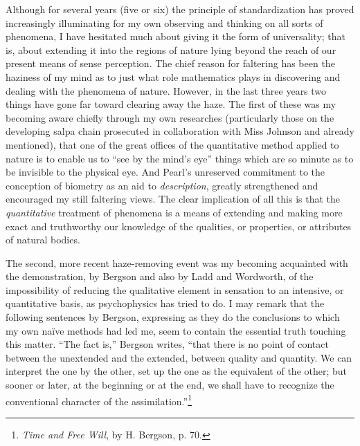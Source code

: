 \documentclass[a4paper, 11pt, oneside, polutonikogreek, english, landscape]{article}
\begin{document}
Although for several years (five or six) the principle of standardization has proved increasingly illuminating for my own observing and thinking on all sorts of phenomena, I have hesitated much about giving it the form of universality; that is, about extending it into the regions of nature lying beyond the reach of our present means of sense perception. The chief reason for faltering has been the haziness of my mind as to just what role mathematics plays in discovering and dealing with the phenomena of nature. However, in the last three years two things have gone far toward clearing away the haze. The first of these was my becoming aware chiefly through my own researches (particularly those on the developing salpa chain prosecuted in collaboration with Miss Johnson and already mentioned), that one of the great offices of the quantitative method applied to nature is to enable us to ``see by the mind's eye'' things which are so minute as to be invisible to the physical eye. And Pearl's unreserved commitment to the conception of biometry as an aid to \emph{description}, greatly strengthened and encouraged my still faltering views. The clear implication of all this is that the \emph{quantitative} treatment of phenomena is a means of extending and making more exact and truthworthy our knowledge of the qualities, or properties, or attributes of natural bodies.

The second, more recent haze-removing event was my becoming acquainted with the demonstration, by Bergson and also by Ladd and Wordworth, of the impossibility of reducing the qualitative element in sensation to an intensive, or quantitative basis, as psychophysics has tried to do. I may remark that the following sentences by Bergson, expressing as they do the conclusions to which my own naïve methods had led me, seem to contain the essential truth touching this matter. ``The fact is,'' Bergson writes, ``that there is no point of contact between the unextended and the extended, between quality and quantity. We can interpret the one by the other, set up the one as the equivalent of the other; but sooner or later, at the beginning or at the end, we shall have to recognize the conventional character of the assimilation.''\footnote{\emph{Time and Free Will}, by H. Bergson, p. 70.}
\end{document}
